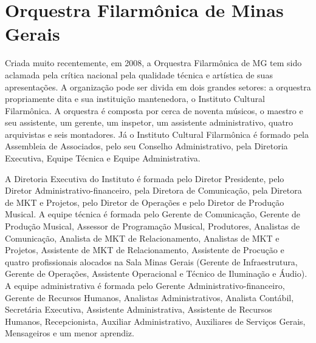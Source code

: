 \documentclass[a4paper, 12pt, openright, oneside, german, french, english, brazil]{abntex2}
\begin{document}





	\chapter{Orquestra Filarmônica de Minas Gerais}

	

	Criada muito recentemente, em 2008, a Orquestra Filarmônica de MG tem sido aclamada pela crítica nacional pela qualidade técnica e artística de suas apresentações. A organização pode ser divida em dois grandes setores: a orquestra propriamente dita e sua instituição mantenedora, o Instituto Cultural Filarmônica. A orquestra é composta por cerca de noventa músicos, o maestro e seu assistente, um gerente, um inspetor, um assistente administrativo, quatro arquivistas e seis montadores. Já o Instituto Cultural Filarmônica é formado pela Assembleia de Associados, pelo seu Conselho Administrativo, pela Diretoria Executiva, Equipe Técnica e Equipe Administrativa.



	A Diretoria Executiva do Instituto é formada pelo Diretor Presidente, pelo Diretor Administrativo-financeiro, pela Diretora de Comunicação, pela Diretora de MKT e Projetos, pelo Diretor de Operações e pelo Diretor de Produção Musical. A equipe técnica é formada pelo Gerente de Comunicação, Gerente de Produção Musical, Assessor de Programação Musical, Produtores, Analistas de Comunicação, Analista de MKT de Relacionamento, Analistas de MKT e Projetos, Assistente de MKT de Relacionamento, Assistente de Procução e quatro profissionais alocados na Sala Minas Gerais (Gerente de Infraestrutura, Gerente de Operações, Assistente Operacional e Técnico de Iluminação e Áudio). A equipe administrativa é formada pelo Gerente Administrativo-financeiro, Gerente de Recursos Humanos, Analistas Administrativos, Analista Contábil, Secretária Executiva, Assistente Administrativa, Assistente de Recursos Humanos, Recepcionista, Auxiliar Administrativo, Auxiliares de Serviços Gerais, Mensageiros e um menor aprendiz.



\end{document}
